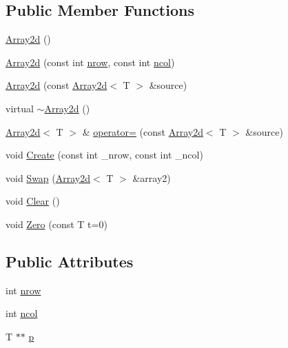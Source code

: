 \subsection*{Public Member Functions}
\begin{DoxyCompactItemize}
\item 
\mbox{\hyperlink{class_array2d_a8c4b92d7f309ef043458835cc3fd2e14}{Array2d}} ()
\item 
\mbox{\hyperlink{class_array2d_ac7c55fd62aeda8ffb83e6c4ae39a2488}{Array2d}} (const int \mbox{\hyperlink{class_array2d_a373dd63664bee40ef720d183d03e5bdb}{nrow}}, const int \mbox{\hyperlink{class_array2d_afe48cd05774cae5b6872324ae49e089b}{ncol}})
\item 
\mbox{\hyperlink{class_array2d_ad3b3759e78a6840cce7b8009fe960621}{Array2d}} (const \mbox{\hyperlink{class_array2d}{Array2d}}$<$ T $>$ \&source)
\item 
virtual \mbox{\hyperlink{class_array2d_afe31cffbc2b8bc84153ec3ad7e40a0e2}{$\sim$\+Array2d}} ()
\item 
\mbox{\hyperlink{class_array2d}{Array2d}}$<$ T $>$ \& \mbox{\hyperlink{class_array2d_aa1c400a330cf1a31bd473bc3742ae51d}{operator=}} (const \mbox{\hyperlink{class_array2d}{Array2d}}$<$ T $>$ \&source)
\item 
void \mbox{\hyperlink{class_array2d_af1d2cec0973cedfe74ae5b967532922f}{Create}} (const int \+\_\+nrow, const int \+\_\+ncol)
\item 
void \mbox{\hyperlink{class_array2d_a24e1766701c30e14fa39bfcb1024bd1a}{Swap}} (\mbox{\hyperlink{class_array2d}{Array2d}}$<$ T $>$ \&array2)
\item 
void \mbox{\hyperlink{class_array2d_a9902a80867777fbf3ba64a6d8c10606e}{Clear}} ()
\item 
void \mbox{\hyperlink{class_array2d_a84070672548d19a9e77b4321527637e0}{Zero}} (const T t=0)
\end{DoxyCompactItemize}
\subsection*{Public Attributes}
\begin{DoxyCompactItemize}
\item 
int \mbox{\hyperlink{class_array2d_a373dd63664bee40ef720d183d03e5bdb}{nrow}}
\item 
int \mbox{\hyperlink{class_array2d_afe48cd05774cae5b6872324ae49e089b}{ncol}}
\item 
T $\ast$$\ast$ \mbox{\hyperlink{class_array2d_ac7b70bc423364c43c7c174cdde515380}{p}}
\end{DoxyCompactItemize}


